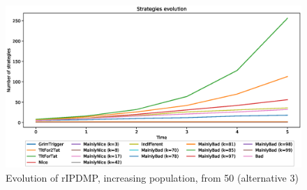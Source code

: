 \documentclass[journal,10pt,twoside]{IEEEtran}
\begin{document}
\begin{figure}
    \centering
    \includegraphics[width=.7\columnwidth]{../img/ripdmp-incr/alt3/ripdmp-evolution-increasing-pop-50}
    \caption{Evolution of rIPDMP, increasing population, from 50 (alternative 3)}
    \label{fig:incrRa3}
\end{figure}



\end{document}
